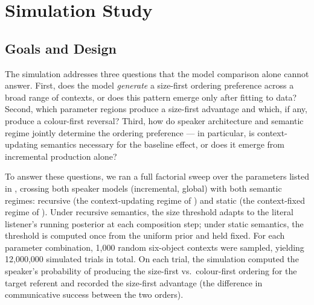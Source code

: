 \documentclass[man,floatsintext]{apa7}
\begin{document}
\section{Simulation Study}
\label{sec:simulation}

\subsection{Goals and Design}

The simulation addresses three questions that the model comparison alone cannot answer.
First, does the model \emph{generate} a size-first ordering preference across a broad range of contexts, or does this pattern emerge only after fitting to data?
Second, which parameter regions produce a size-first advantage and which, if any, produce a colour-first reversal?
Third, how do speaker architecture and semantic regime jointly determine the ordering preference --- in particular, is context-updating semantics necessary for the baseline effect, or does it emerge from incremental production alone?

To answer these questions, we ran a full factorial sweep over the parameters listed in , crossing both speaker models (incremental, global) with both semantic regimes: recursive (the context-updating regime of ) and static (the context-fixed regime of ).
Under recursive semantics, the size threshold adapts to the literal listener's running posterior at each composition step; under static semantics, the threshold is computed once from the uniform prior and held fixed.
For each parameter combination, 1{,}000 random six-object contexts were sampled, yielding 12{,}000{,}000 simulated trials in total.
On each trial, the simulation computed the speaker's probability of producing the size-first vs.\ colour-first ordering for the target referent and recorded the size-first advantage (the difference in communicative success between the two orders).
\end{document}
